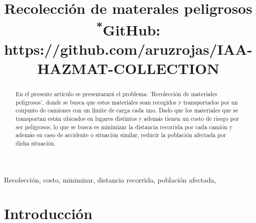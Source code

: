 \documentclass[conference]{IEEEtran}
\begin{document}
\title{Recolecci\'on de materales peligrosos\\
{\footnotesize \textsuperscript{*}GitHub: https://github.com/aruzrojas/IAA-HAZMAT-COLLECTION}
}

\author{

}

\maketitle

\begin{abstract}

En el presente art\'iculo se presentarar\'a el problema: 'Recolecci\'on de materiales peligrosos', donde se busca que estos materiales sean recogidos y transportados por un conjunto de camiones con un límite de carga cada uno. Dado que los materiales que se transportan est\'an ubicados en lugares distintos y adem\'as tienen un costo de riesgo por ser peligrosos, lo que se busca es minimizar la distancia recorrida por cada camión y además en caso de accidente o situación similar, reducir la población afectada por dicha situación.

\end{abstract}

\begin{IEEEkeywords}
Recolecci\'on, costo, minimizar, distancia recorrida, poblaci\'on afectada,
\end{IEEEkeywords}

\section{Introducci\'on}
\end{document}
